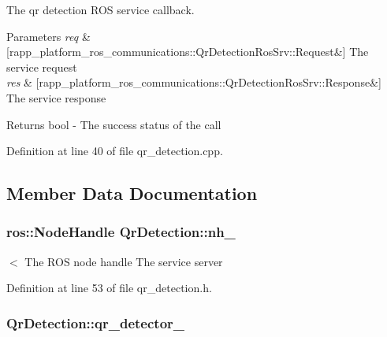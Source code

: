 The qr detection R\-O\-S service callback. 


\begin{DoxyParams}{Parameters}
{\em req} & \mbox{[}rapp\-\_\-platform\-\_\-ros\-\_\-communications\-::\-Qr\-Detection\-Ros\-Srv\-::\-Request\&\mbox{]} The service request \\
\hline
{\em res} & \mbox{[}rapp\-\_\-platform\-\_\-ros\-\_\-communications\-::\-Qr\-Detection\-Ros\-Srv\-::\-Response\&\mbox{]} The service response \\
\hline
\end{DoxyParams}
\begin{DoxyReturn}{Returns}
bool -\/ The success status of the call 
\end{DoxyReturn}


Definition at line 40 of file qr\-\_\-detection.\-cpp.



\subsection{Member Data Documentation}
\hypertarget{classQrDetection_ab99255e948da428610958e3da45cc692}{
\subsubsection[{nh\-\_\-}]{\setlength{\rightskip}{0pt plus 5cm}ros\-::\-Node\-Handle Qr\-Detection\-::nh\-\_\-\hspace{0.3cm}{\ttfamily [private]}}}\label{classQrDetection_ab99255e948da428610958e3da45cc692}
$<$ The R\-O\-S node handle The service server 

Definition at line 53 of file qr\-\_\-detection.\-h.

\hypertarget{classQrDetection_a5417be9d21d01ff82067b022bfd613fe}{
\subsubsection[{qr\-\_\-detector\-\_\-}]{ Qr\-Detection\-::qr\-\_\-detector\-\_\-\hspace{0.3cm}{\ttfamily [private]}}}\label{classQrDetection_a5417be9d21d01ff82067b022bfd613fe}


